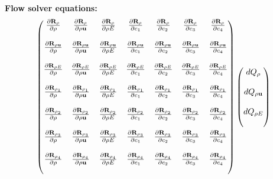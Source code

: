 \documentclass[a4paper]{article}
\begin{document}
\begin{landscape}

  \begin{huge}
  \bf{Flow solver equations:}
  \begin{equation}
    \begin{pmatrix}
      \rdiff{\rho}{\rho}     & \rdiff{\rho}{\rho \vu}     &  \rdiff{\rho}{\rho E}     & \rdiff{\rho}{c_1}     & \rdiff{\rho}{c_2}     & \rdiff{\rho}{c_3}     & \rdiff{\rho}{c_4}      \\ \\
      \rdiff{\rho \vu}{\rho} & \rdiff{\rho \vu}{\rho \vu} &  \rdiff{\rho \vu}{\rho E} & \rdiff{\rho \vu}{c_1} & \rdiff{\rho \vu}{c_2} & \rdiff{\rho \vu}{c_3} & \rdiff{\rho \vu}{c_4}  \\ \\
      \rdiff{\rho E}{\rho}   & \rdiff{\rho E}{\rho \vu}   &  \rdiff{\rho E}{\rho E}   & \rdiff{\rho E}{c_1}   & \rdiff{\rho E}{c_2}   & \rdiff{\rho E}{c_3}   & \rdiff{\rho E}{c_4}    \\ \\
      \rdiff{\rho_1}{\rho}   & \rdiff{\rho_1}{\rho \vu}   &  \rdiff{\rho_1}{\rho E}   & \rdiff{\rho_1}{c_1}   & \rdiff{\rho_1}{c_2}   & \rdiff{\rho_1}{c_3}   & \rdiff{\rho_1}{c_4}    \\ \\
      \rdiff{\rho_2}{\rho}   & \rdiff{\rho_2}{\rho \vu}   &  \rdiff{\rho_2}{\rho E}   & \rdiff{\rho_2}{c_1}   & \rdiff{\rho_2}{c_2}   & \rdiff{\rho_2}{c_3}   & \rdiff{\rho_2}{c_4}    \\ \\
      \rdiff{\rho_3}{\rho}   & \rdiff{\rho_3}{\rho \vu}   &  \rdiff{\rho_3}{\rho E}   & \rdiff{\rho_3}{c_1}   & \rdiff{\rho_3}{c_2}   & \rdiff{\rho_3}{c_3}   & \rdiff{\rho_3}{c_4}    \\ \\
      \rdiff{\rho_4}{\rho}   & \rdiff{\rho_4}{\rho \vu}   &  \rdiff{\rho_4}{\rho E}   & \rdiff{\rho_4}{c_1}   & \rdiff{\rho_4}{c_2}   & \rdiff{\rho_4}{c_3}   & \rdiff{\rho_4}{c_4}    \\ \\
    \end{pmatrix}
    \begin{pmatrix}
      dQ_{\rho} \\ \\
      dQ_{\rho \vu} \\ \\
      dQ_{\rho E} \\ \\

\end{pmatrix}
\end{equation}
\end{huge}
\end{landscape}
\end{document}
